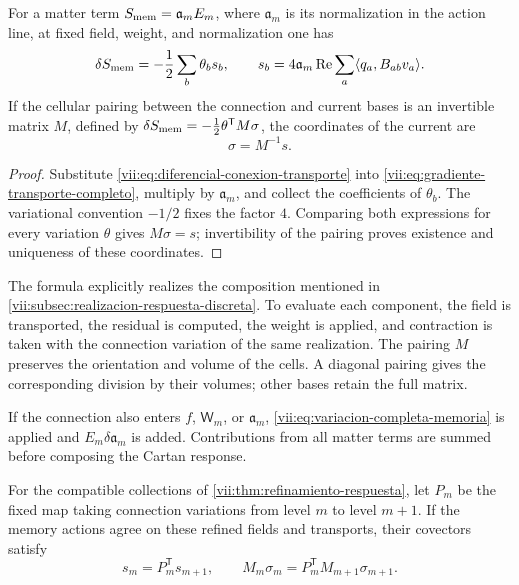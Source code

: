 \begin{theorem}
\label{vii:thm:corriente-conexion-evaluada}
For a matter term \(S_{\rm mem}=\mathfrak a_m E_m\),
where \(\mathfrak a_m\) is its normalization in the action line,
at fixed field, weight, and normalization one has
\begin{equation}
 \delta S_{\rm mem}=-\frac12\sum_b\theta_b s_b,\qquad
 s_b=4\mathfrak a_m\operatorname{Re}
        \sum_a\langle q_a,B_{ab}v_a\rangle.
 \label{vii:eq:componentes-corriente-conexion}
\end{equation}
If the cellular pairing between the connection and current bases is
an invertible matrix \(M\), defined by
\(\delta S_{\rm mem}=-\tfrac12\theta^{\mathsf T}M\sigma\),
the coordinates of the current are
\begin{equation}
 \sigma=M^{-1}s.
 \label{vii:eq:coordenadas-corriente-material}
\end{equation}
\end{theorem}

\begin{proof}
Substitute \eqref{vii:eq:diferencial-conexion-transporte} into
\eqref{vii:eq:gradiente-transporte-completo}, multiply by
\(\mathfrak a_m\), and collect the coefficients of
\(\theta_b\). The variational convention \(-1/2\) fixes the
factor \(4\). Comparing both expressions for every variation
\(\theta\) gives \(M\sigma=s\); invertibility of the pairing
proves existence and uniqueness of these coordinates.
\end{proof}

The formula explicitly realizes the composition mentioned in
\ref{vii:subsec:realizacion-respuesta-discreta}. To evaluate each
component, the field is transported, the residual is computed, the
weight is applied, and contraction is taken with the connection
variation of the same realization. The pairing \(M\) preserves
the orientation and volume of the cells. A diagonal pairing gives the
corresponding division by their volumes; other bases retain the full
matrix.

If the connection also enters \(f\), \(\mathsf W_m\),
or \(\mathfrak a_m\),
\eqref{vii:eq:variacion-completa-memoria} is applied and
\(E_m\delta\mathfrak a_m\) is added. Contributions from all
matter terms are summed before composing the Cartan response.

\begin{corollary}
\label{vii:cor:refinamiento-corriente-conexion}
For the compatible collections of
\ref{vii:thm:refinamiento-respuesta}, let \(P_m\) be the fixed
map taking connection variations from level \(m\) to level
\(m+1\). If the memory actions agree on these refined fields and
transports, their covectors satisfy
\[
 s_m=P_m^{\mathsf T}s_{m+1},\qquad
 M_m\sigma_m=P_m^{\mathsf T}M_{m+1}\sigma_{m+1}.
\]
\end{corollary}

